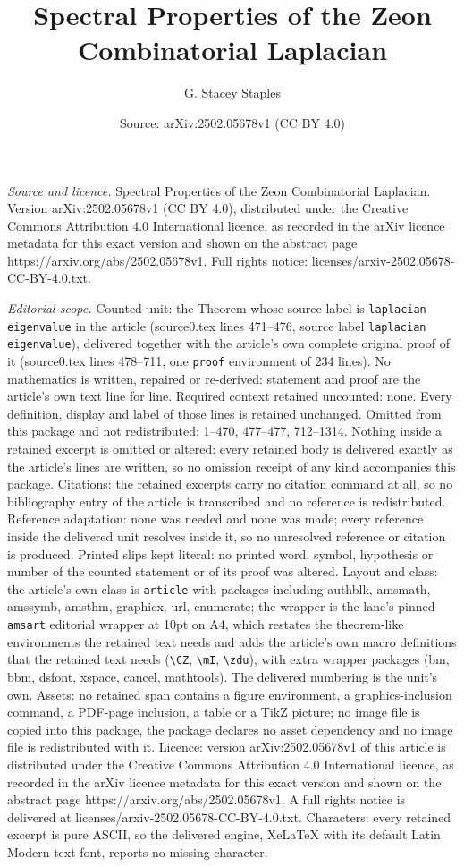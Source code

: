 \documentclass[10pt,a4paper]{amsart}
\title[Spectral Properties of the Zeon Combinatorial Laplacian]{Spectral Properties of the Zeon Combinatorial Laplacian}
\author{G. Stacey Staples}
\date{Source: arXiv:2502.05678v1 (CC BY 4.0)}
\begin{document}
\maketitle

\noindent\emph{Source and licence.} Spectral Properties of the Zeon Combinatorial Laplacian. Version arXiv:2502.05678v1 (CC BY 4.0), distributed under the Creative Commons Attribution 4.0 International licence, as recorded in the arXiv licence metadata for this exact version and shown on the abstract page https://arxiv.org/abs/2502.05678v1. Full rights notice: licenses/arxiv-2502.05678-CC-BY-4.0.txt.\par\smallskip

\noindent\textit{Editorial scope.} Counted unit: the Theorem whose source label is \texttt{laplacian eigenvalue} in the article (source0.tex lines 471--476, source label \texttt{laplacian eigenvalue}), delivered together with the article's own complete original proof of it (source0.tex lines 478--711, one \texttt{proof} environment of 234 lines). No mathematics is written, repaired or re-derived: statement and proof are the article's own text line for line. Required context retained uncounted: none. Every definition, display and label of those lines is retained unchanged. Omitted from this package and not redistributed: 1--470, 477--477, 712--1314. Nothing inside a retained excerpt is omitted or altered: every retained body is delivered exactly as the article's lines are written, so no omission receipt of any kind accompanies this package. Citations: the retained excerpts carry no citation command at all, so no bibliography entry of the article is transcribed and no reference is redistributed. Reference adaptation: none was needed and none was made; every reference inside the delivered unit resolves inside it, so no unresolved reference or citation is produced. Printed slips kept literal: no printed word, symbol, hypothesis or number of the counted statement or of its proof was altered. Layout and class: the article's own class is \texttt{article} with packages including authblk, amsmath, amssymb, amsthm, graphicx, url, enumerate; the wrapper is the lane's pinned \texttt{amsart} editorial wrapper at 10pt on A4, which restates the theorem-like environments the retained text needs and adds the article's own macro definitions that the retained text needs (\texttt{\textbackslash CZ}, \texttt{\textbackslash mI}, \texttt{\textbackslash zdu}), with extra wrapper packages (bm, bbm, dsfont, xspace, cancel, mathtools). The delivered numbering is the unit's own. Assets: no retained span contains a figure environment, a graphics-inclusion command, a PDF-page inclusion, a table or a TikZ picture; no image file is copied into this package, the package declares no asset dependency and no image file is redistributed with it. Licence: version arXiv:2502.05678v1 of this article is distributed under the Creative Commons Attribution 4.0 International licence, as recorded in the arXiv licence metadata for this exact version and shown on the abstract page https://arxiv.org/abs/2502.05678v1. A full rights notice is delivered at licenses/arxiv-2502.05678-CC-BY-4.0.txt. Characters: every retained excerpt is pure ASCII, so the delivered engine, XeLaTeX with its default Latin Modern text font, reports no missing character.
\end{document}
